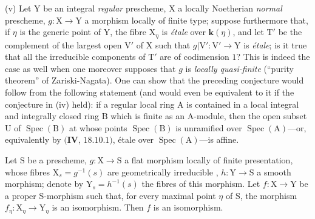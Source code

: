 \begin{remarks}[21.12.14]
(v) Let $\mathrm{Y}$ be an integral \emph{regular} prescheme, $\mathrm{X}$ a locally Noetherian \emph{normal} prescheme, $g:\mathrm{X}\to\mathrm{Y}$ a morphism locally of finite type; suppose furthermore that, if $\eta$ is the generic point of $\mathrm{Y}$, the fibre $\mathrm{X}_\eta$ is \emph{\'etale} over $\boldsymbol{k}(\eta)$, and let $\mathrm{T}'$ be the complement of the largest open $\mathrm{V}'$ of $\mathrm{X}$ such that $g|\mathrm{V}':\mathrm{V}'\to\mathrm{Y}$ is \emph{\'etale}; is it true that all the irreducible components of $\mathrm{T}'$ are of codimension $1$?
This is indeed the case as well when one moreover supposes that $g$ is \emph{locally quasi-finite} (``purity theorem'' of Zariski-Nagata).
One can show that the preceding conjecture would follow from the following statement (and would even be equivalent to it if the conjecture in (iv) held): if a regular local ring $\mathrm{A}$ is contained in a local integral and integrally closed ring $\mathrm{B}$ which is finite as an A-module, then the open subset $\mathrm{U}$ of $\operatorname{Spec}(\mathrm{B})$ at whose points $\operatorname{Spec}(\mathrm{B})$ is unramified over $\operatorname{Spec}(\mathrm{A})$---or, equivalently by $(\mathbf{IV}$, $18.10.1)$, \'etale over $\operatorname{Spec}(\mathrm{A})$---is affine.
\end{remarks}

\begin{proposition}[21.12.15]
\label{IV.21.12.15}
Let $\mathrm{S}$ be a prescheme, $g:\mathrm{X}\to\mathrm{S}$ a flat morphism locally of finite presentation, whose fibres $\mathrm{X}_s=g^{-1}(s)$ are geometrically irreducible , $h:\mathrm{Y}\to\mathrm{S}$ a smooth morphism; denote by $\mathrm{Y}_s=h^{-1}(s)$ the fibres of this morphism.
Let $f:\mathrm{X}\to\mathrm{Y}$ be a proper S-morphism such that, for every maximal point $\eta$ of $\mathrm{S}$, the morphism $f_\eta:\mathrm{X}_\eta\to\mathrm{Y}_\eta$ is an isomorphism.
Then $f$ is an isomorphism.
\end{proposition}


